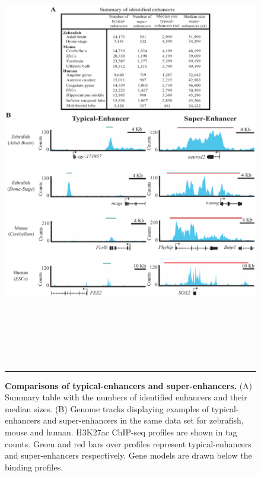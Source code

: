 		\begin{figure}[!h]
			\centering
			\includegraphics[width=16cm,height=18.6cm]{./figures/Figure_2.pdf}
  			\caption[Super-enhancers]{\textbf{Comparisons of typical-enhancers and super-enhancers.} (A) Summary table with the numbers of identified enhancers and their median sizes. (B) Genome tracks displaying examples of typical-enhancers and super-enhancers in the same data set for zebrafish, mouse and human. H3K27ac ChIP-seq profiles are shown in tag counts. Green and red bars over profiles represent typical-enhancers and super-enhancers respectively. Gene models are drawn below the binding profiles.}
			\label{Super-enhancers}
			\rule{\textwidth}{0.25mm}
		\end{figure}

